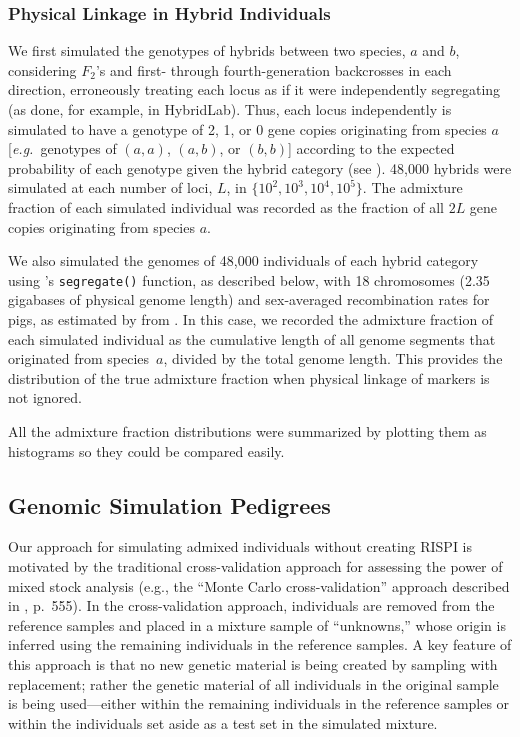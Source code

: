 


\subsubsection*{Physical Linkage in Hybrid Individuals}

We first simulated the genotypes of hybrids between two species, $a$ and $b$,
considering $F_2$'s and first- through
fourth-generation backcrosses in each direction, erroneously treating each
locus as if it were independently segregating (as done, for example, in {\sc HybridLab}). Thus,
each locus independently is simulated to have a genotype of 2, 1, or 0 gene copies originating from species $a$ [{\em e.g.}~genotypes of $(a,a)$, $(a,b)$, or $(b,b)$] according to the expected
probability of each genotype given the hybrid category (see \citealt{anderson2002model}).
48,000 hybrids were simulated at each number of loci, $L$, in $\{10^2, 10^3, 10^4, 10^5\}$.
The admixture fraction of each simulated individual was recorded as the fraction of all $2L$
gene copies originating from species $a$.  

We also simulated the genomes of 48,000 individuals of each
hybrid category using \gscramble{}'s {\footnotesize\tt segregate()} function, as described
below, with 18 chromosomes (2.35 gigabases of physical genome length)  and
sex-averaged recombination rates
for pigs, as estimated by from \citet{tortereau2012high}. In this case, we recorded the
admixture fraction of each simulated individual as the cumulative length of all genome segments
that originated from species~$a$, divided by the total genome length.  This provides the distribution of the true admixture fraction
when physical linkage of markers is not ignored.  

All the admixture fraction distributions were summarized by plotting them as histograms
so they could be compared easily.  


\subsection*{Genomic Simulation Pedigrees}

Our approach for simulating admixed individuals without creating RISPI is motivated by the traditional cross-validation
approach for assessing the power of mixed stock analysis (e.g., the ``Monte Carlo cross-validation'' approach
described in \citealt{moran2019bayesian}, p.~555).
In the cross-validation approach, individuals are removed from the reference
samples and placed in a mixture sample of ``unknowns,'' whose origin
is inferred using the remaining individuals in the reference samples.  A key
feature of this approach is that no new genetic material is being created by
sampling with replacement; rather the genetic material of all individuals
in the original sample is being used---either within the remaining individuals in the
reference samples or within the individuals set aside as a test set in the
simulated mixture.

